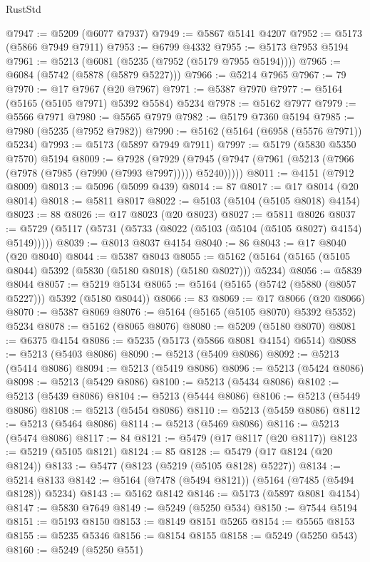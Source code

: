 \begin{lexlean}{RustStd}
\begin{coremodule}
@7947 := @5209 (@6077 @7937)
@7949 := @5867 @5141 @4207
@7952 := @5173 (@5866 @7949 @7911)
@7953 := @6799 @4332
@7955 := @5173 @7953 @5194
@7961 := @5213 (@6081 (@5235 (@7952 (@5179 @7955 @5194))))
@7965 := @6084 (@5742 (@5878 (@5879 @5227)))
@7966 := @5214 @7965
@7967 := 79
@7970 := @17 @7967 (@20 @7967)
@7971 := @5387 @7970
@7977 := @5164 (@5165 (@5105 @7971) @5392 @5584) @5234
@7978 := @5162 @7977
@7979 := @5566 @7971
@7980 := @5565 @7979
@7982 := @5179 @7360 @5194
@7985 := @7980 (@5235 (@7952 @7982))
@7990 := @5162 (@5164 (@6958 (@5576 @7971)) @5234)
@7993 := @5173 (@5897 @7949 @7911)
@7997 := @5179 (@5830 @5350 @7570) @5194
@8009 := @7928
    (@7929 (@7945 (@7947 (@7961 (@5213 (@7966 (@7978 (@7985 (@7990 (@7993 @7997))))) @5240)))))
@8011 := @4151 (@7912 @8009)
@8013 := @5096 (@5099 @439)
@8014 := 87
@8017 := @17 @8014 (@20 @8014)
@8018 := @5811 @8017
@8022 := @5103 (@5104 (@5105 @8018) @4154)
@8023 := 88
@8026 := @17 @8023 (@20 @8023)
@8027 := @5811 @8026
@8037 := @5729 (@5117 (@5731 (@5733 (@8022 (@5103 (@5104 (@5105 @8027) @4154) @5149)))))
@8039 := @8013 @8037 @4154
@8040 := 86
@8043 := @17 @8040 (@20 @8040)
@8044 := @5387 @8043
@8055 := @5162 (@5164 (@5165 (@5105 @8044) @5392 (@5830 (@5180 @8018) (@5180 @8027))) @5234)
@8056 := @5839 @8044
@8057 := @5219 @5134
@8065 := @5164 (@5165 (@5742 (@5880 (@8057 @5227))) @5392 (@5180 @8044))
@8066 := 83
@8069 := @17 @8066 (@20 @8066)
@8070 := @5387 @8069
@8076 := @5164 (@5165 (@5105 @8070) @5392 @5352) @5234
@8078 := @5162 (@8065 @8076)
@8080 := @5209 (@5180 @8070)
@8081 := @6375 @4154
@8086 := @5235 (@5173 (@5866 @8081 @4154) @6514)
@8088 := @5213 (@5403 @8086)
@8090 := @5213 (@5409 @8086)
@8092 := @5213 (@5414 @8086)
@8094 := @5213 (@5419 @8086)
@8096 := @5213 (@5424 @8086)
@8098 := @5213 (@5429 @8086)
@8100 := @5213 (@5434 @8086)
@8102 := @5213 (@5439 @8086)
@8104 := @5213 (@5444 @8086)
@8106 := @5213 (@5449 @8086)
@8108 := @5213 (@5454 @8086)
@8110 := @5213 (@5459 @8086)
@8112 := @5213 (@5464 @8086)
@8114 := @5213 (@5469 @8086)
@8116 := @5213 (@5474 @8086)
@8117 := 84
@8121 := @5479 (@17 @8117 (@20 @8117))
@8123 := @5219 (@5105 @8121)
@8124 := 85
@8128 := @5479 (@17 @8124 (@20 @8124))
@8133 := @5477 (@8123 (@5219 (@5105 @8128) @5227))
@8134 := @5214 @8133
@8142 := @5164 (@7478 (@5494 @8121)) (@5164 (@7485 (@5494 @8128)) @5234)
@8143 := @5162 @8142
@8146 := @5173 (@5897 @8081 @4154)
@8147 := @5830 @7649
@8149 := @5249 (@5250 @534)
@8150 := @7544 @5194
@8151 := @5193 @8150
@8153 := @8149 @8151 @5265
@8154 := @5565 @8153
@8155 := @5235 @5346
@8156 := @8154 @8155
@8158 := @5249 (@5250 @543)
@8160 := @5249 (@5250 @551)

\end{coremodule}
\end{lexlean}

